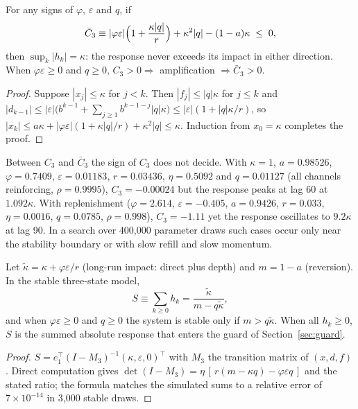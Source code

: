 \begin{theorem}\label{thm:noover}
For any signs of $\varphi$, $\varepsilon$ and $q$, if
\[
\bar C_3\equiv|\varphi\varepsilon|\Bigl(1+\frac{\kappa|q|}{r}\Bigr)+\kappa^2|q|-(1-a)\kappa\;\le\;0,
\]
then $\sup_k|h_k|=\kappa$: the response never exceeds its impact in either direction. When $\varphi\varepsilon\ge0$ and $q\ge0$, $C_3>0\Rightarrow$ amplification $\Rightarrow\bar C_3>0$.
\end{theorem}

\begin{proof}
Suppose $|x_j|\le\kappa$ for $j<k$. Then $|f_j|\le|q|\kappa$ for $j\le k$ and $|d_{k-1}|\le|\varepsilon|\bigl(b^{k-1}+\sum_{j\ge1}b^{k-1-j}|q|\kappa\bigr)\le|\varepsilon|(1+|q|\kappa/r)$, so $|x_k|\le a\kappa+|\varphi\varepsilon|(1+\kappa|q|/r)+\kappa^2|q|\le\kappa$. Induction from $x_0=\kappa$ completes the proof.
\end{proof}

\begin{remark}\label{rem:counter}
Between $C_3$ and $\bar C_3$ the sign of $C_3$ does not decide. With $\kappa=1$, $a=0.98526$, $\varphi=0.7409$, $\varepsilon=0.01183$, $r=0.03436$, $\eta=0.5092$ and $q=0.01127$ (all channels reinforcing, $\rho=0.9995$), $C_3=-0.00024$ but the response peaks at lag 60 at $1.092\kappa$. With replenishment ($\varphi=2.614$, $\varepsilon=-0.405$, $a=0.9426$, $r=0.033$, $\eta=0.0016$, $q=0.0785$, $\rho=0.998$), $C_3=-1.11$ yet the response oscillates to $9.2\kappa$ at lag 90. In a search over 400{,}000 parameter draws such cases occur only near the stability boundary or with slow refill and slow momentum.
\end{remark}

\begin{proposition}\label{prop:sum}
Let $\tilde\kappa=\kappa+\varphi\varepsilon/r$ (long-run impact: direct plus depth) and $m=1-a$ (reversion). In the stable three-state model,
\[
S\equiv\sum_{k\ge0}h_k=\frac{\tilde\kappa}{m-q\tilde\kappa},
\]
and when $\varphi\varepsilon\ge0$ and $q\ge0$ the system is stable only if $m>q\tilde\kappa$. When all $h_k\ge0$, $S$ is the summed absolute response that enters the guard of Section~\ref{sec:guard}.
\end{proposition}

\begin{proof}
$S=e_1^\top(I-M_3)^{-1}(\kappa,\varepsilon,0)^\top$ with $M_3$ the transition matrix of $(x,d,f)$. Direct computation gives $\det(I-M_3)=\eta\,[\,r(m-\kappa q)-\varphi\varepsilon q\,]$ and the stated ratio; the formula matches the simulated sums to a relative error of $7\times10^{-14}$ in 3{,}000 stable draws.
\end{proof}

